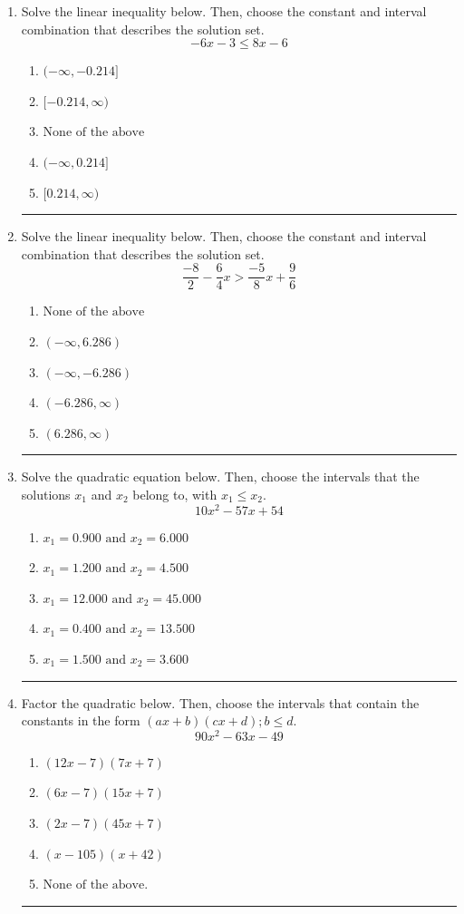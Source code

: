 \documentclass[14pt]{extbook}
\newcommand{\litem}[1]{\item#1\hspace*{-1cm}\rule{\textwidth}{0.4pt}}
\begin{document}
\begin{enumerate}
{\begin{enumerate}[label=\Alph*.]
\end{enumerate} }
\litem{
Solve the linear inequality below. Then, choose the constant and interval combination that describes the solution set.\[ -6x -3 \leq 8x -6 \]\begin{enumerate}[label=\Alph*.]
\item \( (-\infty, -0.214] \)
\item \( [-0.214, \infty) \)
\item \( \text{None of the above} \)
\item \( (-\infty, 0.214] \)
\item \( [0.214, \infty) \)

\end{enumerate} }
\litem{
Solve the linear inequality below. Then, choose the constant and interval combination that describes the solution set.\[ \frac{-8}{2} - \frac{6}{4} x > \frac{-5}{8} x + \frac{9}{6} \]\begin{enumerate}[label=\Alph*.]
\item \( \text{None of the above} \)
\item \( (-\infty, 6.286) \)
\item \( (-\infty, -6.286) \)
\item \( (-6.286, \infty) \)
\item \( (6.286, \infty) \)

\end{enumerate} }
\litem{
Solve the quadratic equation below. Then, choose the intervals that the solutions $x_1$ and $x_2$ belong to, with $x_1 \leq x_2$.\[ 10x^{2} -57 x + 54 \]\begin{enumerate}[label=\Alph*.]
\item \( x_1 = 0.900 \text{ and } x_2 = 6.000 \)
\item \( x_1 = 1.200 \text{ and } x_2 = 4.500 \)
\item \( x_1 = 12.000 \text{ and } x_2 = 45.000 \)
\item \( x_1 = 0.400 \text{ and } x_2 = 13.500 \)
\item \( x_1 = 1.500 \text{ and } x_2 = 3.600 \)

\end{enumerate} }
\litem{
Factor the quadratic below. Then, choose the intervals that contain the constants in the form $(ax+b)(cx+d); b \leq d.$\[ 90x^{2} -63 x -49 \]\begin{enumerate}[label=\Alph*.]
\item \( (12x -7)(7x + 7) \)
\item \( (6x -7)(15x + 7) \)
\item \( (2x -7)(45x + 7) \)
\item \( (x -105)(x + 42) \)
\item \( \text{None of the above.} \)


\end{enumerate}}
\end{enumerate}
\end{document}
